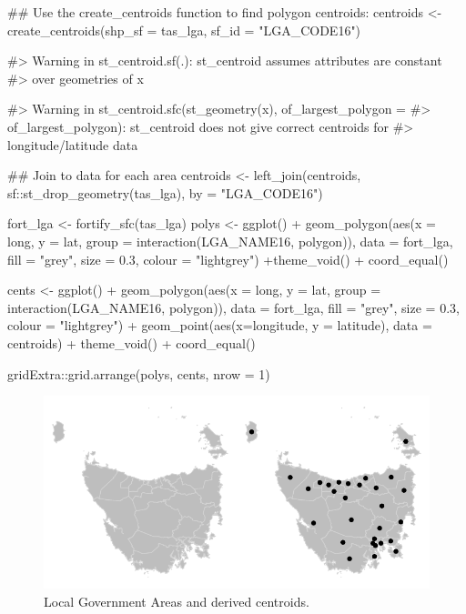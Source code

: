 \begin{Schunk}
\begin{Sinput}
## Use the create_centroids function to find polygon centroids:
centroids <- create_centroids(shp_sf = tas_lga, sf_id = "LGA_CODE16")
\end{Sinput}
\begin{Soutput}
#> Warning in st_centroid.sf(.): st_centroid assumes attributes are constant
#> over geometries of x
\end{Soutput}
\begin{Soutput}
#> Warning in st_centroid.sfc(st_geometry(x), of_largest_polygon =
#> of_largest_polygon): st_centroid does not give correct centroids for
#> longitude/latitude data
\end{Soutput}
\begin{Sinput}
## Join to data for each area
centroids <- left_join(centroids,
  sf::st_drop_geometry(tas_lga), by = "LGA_CODE16")
\end{Sinput}
\end{Schunk}

\begin{Schunk}
\begin{Sinput}
fort_lga <- fortify_sfc(tas_lga)
polys <- ggplot() + 
  geom_polygon(aes(x = long, y = lat, group = interaction(LGA_NAME16, polygon)), data = fort_lga, fill = "grey", size = 0.3, colour = "lightgrey") +theme_void() + coord_equal()

cents <- ggplot() + 
  geom_polygon(aes(x = long, y = lat, group = interaction(LGA_NAME16, polygon)), data = fort_lga, fill = "grey", size = 0.3, colour = "lightgrey") + geom_point(aes(x=longitude, y = latitude), data = centroids) + theme_void() + coord_equal()

gridExtra::grid.arrange(polys, cents, nrow = 1)
\end{Sinput}
\begin{figure}
\includegraphics{algorithmRjournal_files/figure-latex/end_cents-1} \caption[Local Government Areas and derived centroids]{Local Government Areas and derived centroids.}\label{fig:end_cents}
\end{figure}
\end{Schunk}

